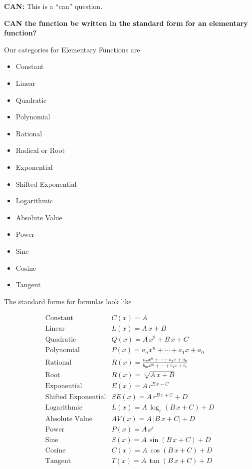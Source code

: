 \documentclass{ximera}
\begin{document}
\textbf{\textcolor{purple!85!blue}{CAN:}}   This is a ``can'' question. \\

\begin{center}
\textbf{\textcolor{red!70!black}{CAN the function be written in the standard form for an elementary function?}}

\end{center}



Our categories for Elementary Functions are

\begin{itemize}
    \item Constant
    \item Linear
    \item Quadratic
    \item Polynomial
    \item Rational
    \item Radical or Root
    \item Exponential
    \item Shifted Exponential 
    \item Logarithmic
    \item Absolute Value
    \item Power
    \item Sine
    \item Cosine
    \item Tangent
\end{itemize} 





The standard forms for formulas look like



\[
\begin{array}{ll}
\text{Constant}  & C(x) = A  \\
\text{Linear}  & L(x) = A \, x + B  \\
\text{Quadratic}  & Q(x) = A \, x^2 + B \, x + C  \\
\text{Polynomial}  & P(x) = a_n x^n + \cdots + a_1 x + a_0  \\
\text{Rational}  & R(x) = \frac{a_n x^n + \cdots + a_1 x + a_0}{b_m x^m + \cdots + b_1 x + b_0}  \\
\text{Root}  & R(x) = \sqrt[n]{A \, x + B}  \\
\text{Exponential}  & E(x) = A \, r^{B \, x + C}  \\
\text{Shifted Exponential}  & SE(x) = A \, r^{B \, x + C} + D  \\
\text{Logarithmic}  & L(x) = A \, \log_r(B \, x + C) + D  \\
\text{Absolute Value}  & AV(x) = A \, |B \, x + C| + D \\
\text{Power}  & P(x) = A \, x^r  \\
\text{Sine}  & S(x) = A \, \sin(B \, x + C) + D  \\
\text{Cosine}  & C(x) = A \, \cos(B \, x + C) + D  \\
\text{Tangent}  & T(x) = A \, \tan(B \, x + C) + D  
\end{array}
\]
\end{document}

